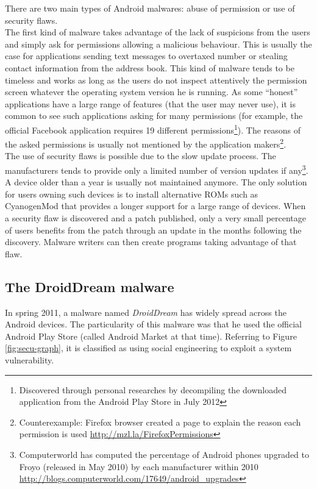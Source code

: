 There are two main types of Android malwares: abuse of permission or use of security flaws.\\

The first kind of malware takes advantage of the lack of suspicions from the users and simply ask for permissions allowing a malicious behaviour.
This is usually the case for applications sending text messages to overtaxed number or stealing contact information from the address book.
This kind of malware tends to be timeless and works as long as the users do not inspect attentively the permission screen whatever the operating system version he is running.
As some ``honest'' applications have a large range of features (that the user may never use), it is common to see such applications asking for many permissions (for example, the official Facebook application requires 19 different permissions\footnote{Discovered through personal researches by decompiling the downloaded application from the Android Play Store in July 2012}).
The reasons of the asked permissions is usually not mentioned by the application makers\footnote{Counterexample: Firefox browser created a page to explain the reason each permission is used \url{http://mzl.la/FirefoxPermissions}}.\\

The use of security flaws is possible due to the slow update process.
The manufacturers tends to provide only a limited number of version updates if any\footnote{Computerworld has computed the percentage of Android phones upgraded to Froyo (released in May 2010) by each manufacturer within 2010 \url{http://blogs.computerworld.com/17649/android_upgrades}}.
A device older than a year is usually not maintained anymore.
The only solution for users owning such devices is to install alternative ROMs such as CyanogenMod that provides a longer support for a large range of devices.
When a security flaw is discovered and a patch published, only a very small percentage of users benefits from the patch through an update in the months following the discovery.
Malware writers can then create programs taking advantage of that flaw.\\

\subsection{The DroidDream malware}

In spring 2011, a malware named \emph{DroidDream} has widely spread across the Android devices.
The particularity of this malware was that he used the official Android Play Store (called Android Market at that time).
Referring to Figure \ref{fig:secu-graph}, it is classified as using social engineering to exploit a system vulnerability.\\

